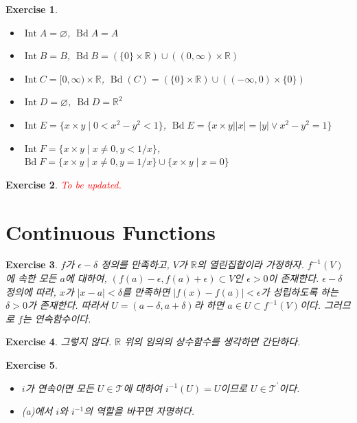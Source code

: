 \documentclass{article}
\newtheorem{exercise}{Exercise}[section]
\newcommand{\R}{\mathbb{R}}
\begin{document}
\begin{exercise}
    \phantom{}
    \begin{itemize}
        \item[(a)] $\operatorname{Int}A=\varnothing$, $\operatorname{Bd}A=A$
        \item[(b)] $\operatorname{Int}B=B$, $\operatorname{Bd}B=(\{0\}\times\R)\cup((0,\infty)\times\R)$
        \item[(c)] $\operatorname{Int}C=[0,\infty)\times\R$, $\operatorname{Bd}(C)=(\{0\}\times\R)\cup((-\infty,0)\times\{0\})$
        \item[(d)] $\operatorname{Int}D=\varnothing$, $\operatorname{Bd}D=\R^2$
        \item[(e)] $\operatorname{Int}E=\{x\times y\mid0<x^2-y^2<1\}$, $\operatorname{Bd}E=\{x\times y\mid\vert x\vert=\vert y\vert\vee x^2-y^2=1\}$
        \item[(f)] $\operatorname{Int}F=\{x\times y\mid x\ne0,y<1/x\}$, $\operatorname{Bd}F=\{x\times y\mid x\ne0,y=1/x\}\cup\{x\times y\mid x=0\}$
    \end{itemize}
\end{exercise}

\begin{exercise}
    \textcolor{red}{To be updated.}
\end{exercise}

\section{Continuous Functions}

\begin{exercise}
    $f$가 $\epsilon-\delta$ 정의를 만족하고, $V$가 $\R$의 열린집합이라 가정하자. $f^{-1}(V)$에 속한 모든 $a$에 대하여, $(f(a)-\epsilon,f(a)+\epsilon)\subset V$인 $\epsilon>0$이 존재한다. $\epsilon-\delta$ 정의에 따라, $x$가 $\vert x-a\vert<\delta$를 만족하면 $\vert f(x)-f(a)\vert<\epsilon$가 성립하도록 하는 $\delta>0$가 존재한다. 따라서 $U=(a-\delta,a+\delta)$라 하면 $a\in U\subset f^{-1}(V)$이다. 그러므로 $f$는 연속함수이다.
\end{exercise}

\begin{exercise}
    그렇지 않다. $\R$ 위의 임의의 상수함수를 생각하면 간단하다.
\end{exercise}

\begin{exercise}
    \phantom{}
    \begin{itemize}
        \item[(a)] $i$가 연속이면 모든 $U\in\mathcal{T}$에 대하여 $i^{-1}(U)=U$이므로 $U\in\mathcal{T}^{\prime}$이다.
        \item[(b)] (a)에서 $i$와 $i^{-1}$의 역할을 바꾸면 자명하다.
    \end{itemize}
\end{exercise}
\end{document}
